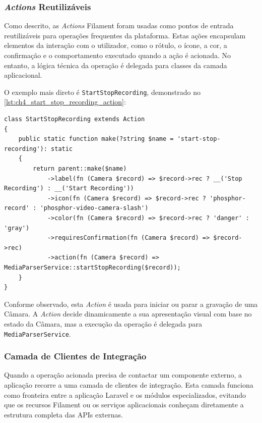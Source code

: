 \subsubsection{\textit{Actions} Reutilizáveis}

Como descrito, as \textit{Actions} Filament foram usadas como pontos de entrada reutilizáveis para operações frequentes da plataforma. Estas ações encapsulam elementos da interação com o utilizador, como o rótulo, o ícone, a cor, a confirmação e o comportamento executado quando a ação é acionada. No entanto, a lógica técnica da operação é delegada para classes da camada aplicacional.

O exemplo mais direto é \texttt{StartStopRecording}, demonstrado no \autoref{lst:ch4_start_stop_recording_action}: 

\par\noindent\begin{minipage}{\linewidth}
\begin{lstlisting}[caption={Action reutilizável para iniciar ou parar gravação (php)},label={lst:ch4_start_stop_recording_action}]
class StartStopRecording extends Action
{
    public static function make(?string $name = 'start-stop-recording'): static
    {
        return parent::make($name)
            ->label(fn (Camera $record) => $record->rec ? __('Stop Recording') : __('Start Recording'))
            ->icon(fn (Camera $record) => $record->rec ? 'phosphor-record' : 'phosphor-video-camera-slash')
            ->color(fn (Camera $record) => $record->rec ? 'danger' : 'gray')
            ->requiresConfirmation(fn (Camera $record) => $record->rec)
            ->action(fn (Camera $record) => MediaParserService::startStopRecording($record));
    }
}
\end{lstlisting}
\end{minipage}

Conforme observado, esta \textit{Action} é usada para iniciar ou parar a gravação de uma Câmara. A \textit{Action} decide dinamicamente a sua apresentação visual com base no estado da Câmara, mas a execução da operação é delegada para \texttt{MediaParserService}.

\subsubsection{Camada de Clientes de Integração}

Quando a operação acionada precisa de contactar um componente externo, a aplicação recorre a uma camada de clientes de integração. Esta camada funciona como fronteira entre a aplicação Laravel e os módulos especializados, evitando que os recursos Filament ou os serviços aplicacionais conheçam diretamente a estrutura completa das \glspl{API} externas.

